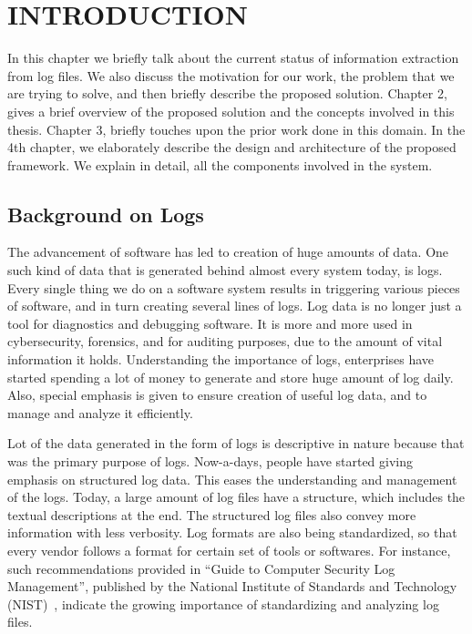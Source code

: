 \chapter{INTRODUCTION}
\thispagestyle{plain}

\label{Introduction}

In this chapter we briefly talk about the current status of information extraction from log files. We also discuss the motivation for our work, the problem that we are trying to solve, and then briefly describe the proposed solution. Chapter 2, gives a brief overview of the proposed solution and the concepts involved in this thesis. Chapter 3, briefly touches upon the prior work done in this domain. In the 4th chapter, we elaborately describe the design and architecture of the proposed framework. We explain in detail, all the components involved in the system.


\section{Background on Logs}

The advancement of software has led to creation of huge amounts of data. One such kind of data that is generated behind almost every system today, is logs. Every single thing we do on a software system results in triggering various pieces of software, and in turn creating several lines of logs. Log data is no longer just a tool for diagnostics and debugging software. It is more and more used in cybersecurity, forensics, and for auditing purposes, due to the amount of vital information it holds. Understanding the importance of logs, enterprises have started spending a lot of money to generate and store huge amount of log daily. Also, special emphasis is given to ensure creation of useful log data,  and to manage and analyze it efficiently.

Lot of the data generated in the form of logs is descriptive in nature because that was the primary purpose of logs. Now-a-days, people have started giving emphasis on structured log data. This eases the understanding and management of the logs. Today, a large amount of log files have a structure, which includes the textual descriptions at the end. The structured log files also convey more information with less verbosity. Log formats are also being standardized, so that every vendor follows a format for certain set of tools or softwares. For instance, such recommendations provided in ``Guide to Computer Security Log Management'', published by the National Institute of Standards and Technology (NIST)~\cite{nist_guide}, indicate the growing importance of standardizing and analyzing log files.


